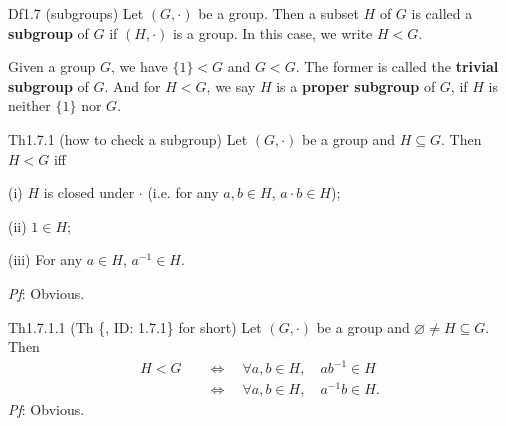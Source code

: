 \documentclass{article}
\begin{document}
\begin{Df}{Df1.7 (subgroups)}
    Let $(G, \cdot)$ be a group. Then a subset $H$ of $G$ is called a \textbf{subgroup} of $G$ if $(H, \cdot)$ is a group. In this case, we write $H < G$.
\end{Df}

\begin{Rmk}{}
    \begin{compactenum}
        \item \textcolor{Th}{Given a group $G$, we have $\{1\} < G$ and $G < G$.} \textcolor{Df}{The former is called the \textbf{trivial subgroup} of $G$.} And \textcolor{Df}{for $H < G$, we say $H$ is a \textbf{proper subgroup} of $G$, if $H$ is neither $\{1\}$ nor $G$.}
    \end{compactenum}
\end{Rmk}

\begin{Th}{Th1.7.1 (how to check a subgroup)}
    Let $(G, \cdot)$ be a group and $H\subseteq G$. Then $H < G$ iff
    \begin{compactenum}
        \item[(i)] $H$ is closed under $\cdot$\; (i.e. for any $a, b\in H$, $a\cdot b\in H$);
        \item[(ii)] $1\in H$;
        \item[(iii)] For any $a\in H$, $a^{-1}\in H$.
    \end{compactenum}
    \tcblower
    \textit{Pf}: Obvious.
\end{Th}

\begin{Th}{Th1.7.1.1 (Th \{, ID: 1.7.1\} for short)}
    Let $(G, \cdot)$ be a group and $\varnothing\neq H\subseteq G$. Then
    $$ \begin{aligned}
        H < G \quad & \Longleftrightarrow \quad \forall a, b\in H, \quad ab^{-1}\in H \\ \quad & \Longleftrightarrow \quad \forall a, b\in H, \quad a^{-1}b\in H. 
    \end{aligned} $$
    \tcblower
    \textit{Pf}: Obvious.
\end{Th}
\end{document}
